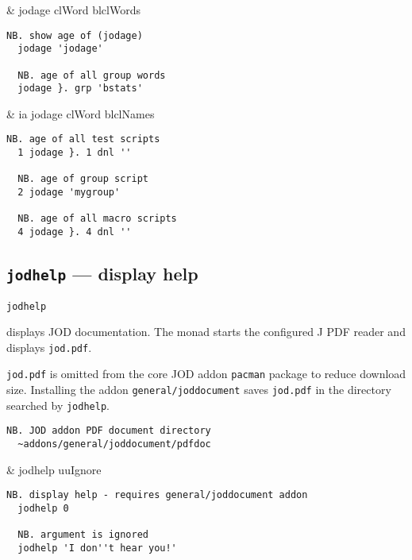 \begin{wordhead}
\monad & jodage clWord \argsep blclWords \\
\end{wordhead}
\begin{lstlisting}[frame=single,framerule=0pt] 
  NB. show age of (jodage)  
  jodage 'jodage' 

  NB. age of all group words 
  jodage }. grp 'bstats' 
\end{lstlisting}

\begin{wordhead}
\dyad & ia jodage clWord \argsep blclNames \\
\end{wordhead}
\begin{lstlisting}[frame=single,framerule=0pt] 
  NB. age of all test scripts  
  1 jodage }. 1 dnl ''   

  NB. age of group script  
  2 jodage 'mygroup'     

  NB. age of all macro scripts  
  4 jodage }. 4 dnl ''   
\end{lstlisting}


\subsection{\texttt{jodhelp} --- display help}\label{ss:jodhelp}  

\hypertarget{il:jodhelp}{\texttt{jodhelp}} displays JOD documentation.  
The monad starts the configured J PDF reader and displays \verb|jod.pdf|. 

\verb|jod.pdf| is omitted from the core JOD addon \texttt{pacman} package to
reduce download size. Installing the addon \texttt{general/joddocument} 
saves \verb|jod.pdf| in the directory searched by \texttt{jodhelp}.
\begin{lstlisting}[frame=single,framerule=0pt]
  NB. JOD addon PDF document directory
  ~addons/general/joddocument/pdfdoc
\end{lstlisting}

\begin{wordhead}
\monad & jodhelp uuIgnore \\
\end{wordhead}
\begin{lstlisting}[frame=single,framerule=0pt] 
  NB. display help - requires general/joddocument addon
  jodhelp 0   

  NB. argument is ignored
  jodhelp 'I don''t hear you!' 
\end{lstlisting}  


